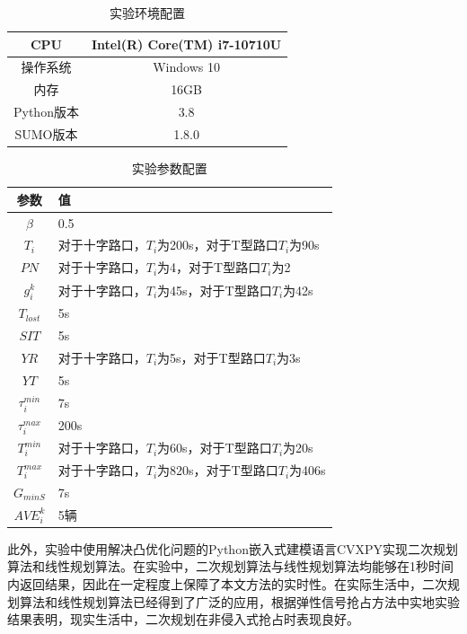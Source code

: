 \begin{table}[H]
	\centering
	\caption{实验环境配置}
	\label{table:shiyanhuanjing}
	\begin{tabular}{|c|c|}
		\hline
		CPU & Intel(R) Core(TM) i7-10710U \\ \hline
		操作系统 & Windows 10 \\ \hline
		内存 & 16GB \\ \hline
		Python版本 & 3.8 \\ \hline
		SUMO版本 & 1.8.0 \\ \hline
	\end{tabular}
\end{table}

\begin{table}[H]
	\centering
	\caption{实验参数配置}
	\label{table:shiyancanshu}
	\begin{tabular}{|c|l|}
		\hline
		参数 & 值 \\ \hline
		${\beta}$ & 0.5 \\ \hline
		${T_i}$ & 对于十字路口，${T_i}$为200s，对于T型路口${T_i}$为90s \\ \hline
		${PN}$ &  对于十字路口，${T_i}$为4，对于T型路口${T_i}$为2 \\ \hline
		${g_i^k}$ & 对于十字路口，${T_i}$为45s，对于T型路口${T_i}$为42s  \\ \hline
		${T_{lost}}$ & 5s \\ \hline
		${SIT}$ & 5s \\ \hline
		${YR}$ & 对于十字路口，${T_i}$为5s，对于T型路口${T_i}$为3s \\ \hline
		${YT}$ & 5s \\ \hline
		${\tau_i^{min}}$ & 7s \\ \hline
		${\tau_i^{max}}$ & 200s \\ \hline
		${T_i^{min}}$ & 对于十字路口，${T_i}$为60s，对于T型路口${T_i}$为20s \\ \hline
		${T_i^{max}}$ & 对于十字路口，${T_i}$为820s，对于T型路口${T_i}$为406s \\ \hline
		${G_{minS}}$ & 7s  \\ \hline
		${AVE_i^k}$ & 5辆 \\ \hline
	\end{tabular}
\end{table}

此外，实验中使用解决凸优化问题的Python嵌入式建模语言CVXPY实现二次规划算法和线性规划算法\cite{diamond2016cvxpy, agrawal2018rewriting}。在实验中，二次规划算法与线性规划算法均能够在1秒时间内返回结果，因此在一定程度上保障了本文方法的实时性。在实际生活中，二次规划算法和线性规划算法已经得到了广泛的应用，根据弹性信号抢占方法\cite{min}中实地实验结果表明，现实生活中，二次规划在非侵入式抢占时表现良好。

